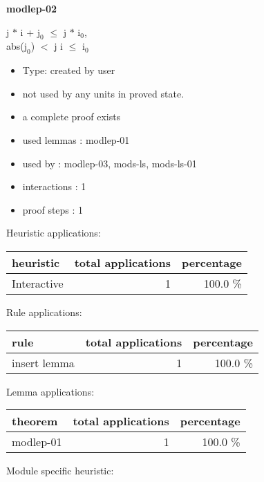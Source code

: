 \documentclass[a4paper]{article}
\begin{document}
\pagebreak

{\LARGE\bf modlep-02}\label{lemma-modlep-02}

\medskip

j $*$ i + $\mbox{j}_{0}$ $\le$ j $*$ $\mbox{i}_{0}$, \\
abs($\mbox{j}_{0}$) $<$ j \Fol i $\le$ $\mbox{i}_{0}$

\begin{itemize}

\item Type: created by user

\item not used by any units in proved state.
\item       a complete proof exists
\item       used lemmas  : modlep-01
\item       used by      : modlep-03, mods-ls, mods-ls-01
\item       interactions : 1
\item       proof steps  : 1
\end{itemize}

\medskip


Heuristic applications:

\begin{supertabular}{l|r|r}
heuristic	& total applications & percentage \\ \hline
Interactive & 1 & 100.0 \% \\

\end{supertabular}

Rule applications:

\begin{supertabular}{l|r|r}
rule	        & total applications & percentage \\ \hline
insert lemma & 1 & 100.0 \% \\

\end{supertabular}

Lemma applications:

\begin{supertabular}{l|r|r}
theorem	        & total applications & percentage \\ \hline
modlep-01 & 1 & 100.0 \% \\

\end{supertabular}

Module specific heuristic:

\pagebreak
\end{document}
